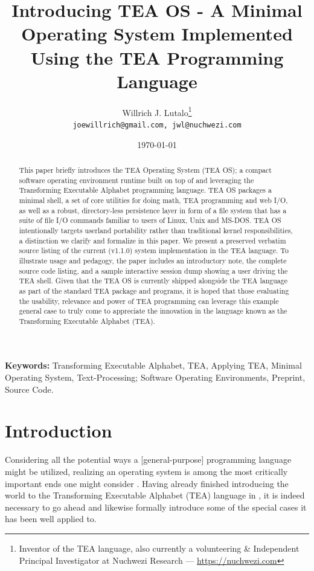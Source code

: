 \documentclass{article}
\title{Introducing TEA OS - A Minimal Operating System Implemented Using the TEA Programming Language}
\author{Willrich J. Lutalo\thanks{Inventor of the TEA language, also currently a volunteering \& Independent Principal Investigator at Nuchwezi Research --- \url{https://nuchwezi.com}}\\
\texttt{joewillrich@gmail.com, jwl@nuchwezi.com}}
\date \today
\begin{document}

\maketitle

\begin{abstract}
This paper briefly introduces the TEA Operating System (TEA OS); a compact software operating environment runtime built on top of and leveraging the Transforming Executable Alphabet programming language. TEA OS packages a minimal shell, a set of core utilities for doing math, TEA programming and web I/O, as well as a robust, directory-less persistence layer in form of a file system that has a suite of file I/O commands familiar to users of Linux, Unix and MS-DOS. TEA OS intentionally targets userland portability rather than traditional kernel responsibilities, a distinction we clarify and formalize in this paper. We present a preserved verbatim source listing of the current (v1.1.0) system implementation in the TEA language. To illustrate usage and pedagogy, the paper includes an introductory note, the complete source code listing, and a sample interactive session dump showing a user driving the TEA shell. Given that the TEA OS is currently shipped alongside the TEA language as part of the standard TEA package and programs, it is hoped that those evaluating the usability, relevance and power of TEA programming can leverage this example general case to truly come to appreciate the innovation in the language known as the Transforming Executable Alphabet (TEA).
\end{abstract}

\textbf{Keywords:} Transforming Executable Alphabet, TEA, Applying TEA, Minimal Operating System, Text-Processing; Software Operating Environments, Preprint, Source Code.

\section{Introduction}


Considering all the potential ways a [general-purpose] programming language might be utilized, realizing an operating system is among the most critically important ends one might consider \cite{Lutalo2024TEATAZ}. Having already finished introducing the world to the Transforming Executable Alphabet (TEA) language in \cite{Lutalo2026TEA}, it is indeed necessary to go ahead and likewise formally introduce some of the special cases it has been well applied to.
\end{document}
